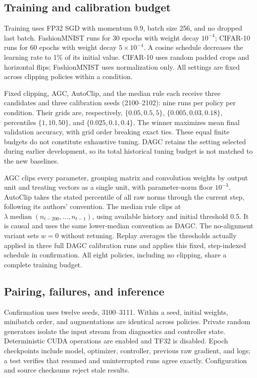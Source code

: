 \documentclass{article}
\begin{document}
\subsection{Training and calibration budget}
Training uses FP32 SGD with momentum $0.9$, batch size 256, and no dropped
last batch. FashionMNIST runs for 30 epochs with weight decay $10^{-4}$;
CIFAR-10 runs for 60 epochs with weight decay $5\times10^{-4}$. A cosine
schedule decreases the learning rate to 1\% of its initial value. CIFAR-10
uses random padded crops and horizontal flips; FashionMNIST uses normalization
only. All settings are fixed across clipping policies within a condition.

Fixed clipping, AGC, AutoClip, and the median rule each receive three
candidates and three calibration seeds (2100--2102): nine runs per policy
per condition. Their grids are, respectively,
$\{0.05,0.5,5\}$,
$\{0.005,0.03,0.18\}$,
percentiles $\{1,10,50\}$, and
$\{0.025,0.1,0.4\}$.
The winner maximizes mean final validation accuracy, with grid order breaking
exact ties. These equal finite budgets do not constitute exhaustive tuning.
DAGC retains the setting selected during earlier development, so its total
historical tuning budget is not matched to the new baselines.

AGC clips every parameter, grouping matrix and convolution weights by output
unit and treating vectors as a single unit, with parameter-norm floor
$10^{-3}$. AutoClip takes the stated percentile of all raw norms through the
current step, following its authors' convention. The median rule clips at
$\lambda\operatorname{median}(n_{t-200},\ldots,n_{t-1})$, using available
history and initial threshold 0.5. It is causal and uses the same lower-median
convention as DAGC. The no-alignment variant sets $w=0$ without retuning.
Replay averages the thresholds actually applied in three full DAGC calibration
runs and applies this fixed, step-indexed schedule in confirmation. All eight
policies, including no clipping, share a complete training budget.

\subsection{Pairing, failures, and inference}
Confirmation uses twelve seeds, 3100--3111. Within a seed, initial weights,
minibatch order, and augmentations are identical across policies. Private
random generators isolate the input stream from diagnostics and controller
state. Deterministic CUDA operations are enabled and TF32 is disabled. Epoch
checkpoints include model, optimizer, controller, previous raw gradient, and
logs; a test verifies that resumed and uninterrupted runs agree exactly.
Configuration and source checksums reject stale results.
\end{document}
